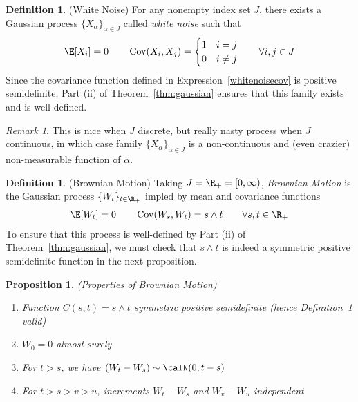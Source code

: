 \documentclass[12pt]{article}
\theoremstyle{plain}
\newtheorem{prop}[thm]{Proposition}
\theoremstyle{definition}
\newtheorem{defn}[thm]{Definition}
\theoremstyle{remark}
\newtheorem*{rmk}{Remark}
\newcommand{\Cov}{\operatorname{Cov}}
\begin{document}
\begin{defn}(White Noise)
For any nonempty index set $J$, there exists a Gaussian process
$\{X_\alpha\}_{\alpha\in J}$ called \emph{white noise} such that
\begin{align}
  \E[X_i]=0
  \qquad
  \Cov(X_i,X_j)
  =
  \begin{cases}
    1 & i=j \\
    0 & i\neq j
  \end{cases}
  \qquad\forall i,j\in J
  \label{whitenoisecov}
\end{align}
Since the covariance function defined in Expression~\ref{whitenoisecov}
is positive semidefinite, Part (ii) of Theorem~\ref{thm:gaussian}
ensures that this family exists and is well-defined.
\end{defn}
\begin{rmk}
This is nice when $J$ discrete, but really nasty process when $J$
continuous, in which case family $\{X_\alpha\}_{\alpha \in J}$ is a
non-continuous and (even crazier) non-measurable function of $\alpha$.
\end{rmk}

\begin{defn}(Brownian Motion)
\label{defn:brownian}
Taking $J=\R_+=[0,\infty)$, \emph{Brownian Motion} is the Gaussian
process $\{W_t\}_{t\in\R_+}$ impled by mean and covariance
functions
\begin{align*}
  \E[W_t]=0
  \qquad
  \Cov(W_s,W_t) = s \wedge t
  \qquad \forall s,t\in\R_+
\end{align*}
To ensure that this process is well-defined by Part (ii) of
Theorem~\ref{thm:gaussian}, we must check that $s\wedge t$ is indeed a
symmetric positive semidefinite function in the next proposition.
\end{defn}

\begin{prop}\emph{(Properties of Brownian Motion)}
\begin{enumerate}[label=\emph{(\roman*)}]
  \item
    Function $C(s,t)=s\wedge t$ symmetric positive semidefinite
    (hence Definition~\ref{defn:brownian} valid)
  \item $W_0=0$ almost surely
  \item For $t>s$, we have $(W_t-W_s)\sim \calN(0,t-s)$
  \item For $t>s>v>u$, increments $W_t-W_s$ and $W_v-W_u$ independent
\end{enumerate}
\end{prop}
\end{document}
